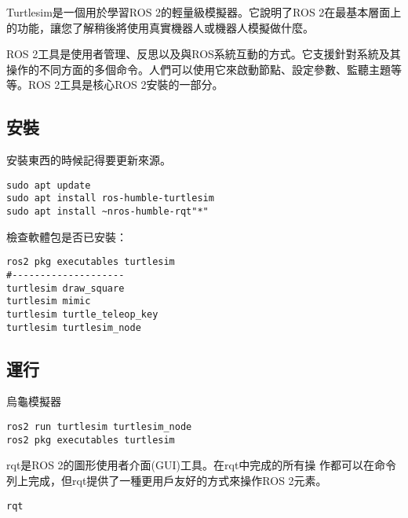 Turtlesim是一個用於學習ROS 2的輕量級模擬器。它說明了ROS 2在最基本層面上的功能，讓您了解稍後將使用真實機器人或機器人模擬做什麼。

ROS 2工具是使用者管理、反思以及與ROS系統互動的方式。它支援針對系統及其操作的不同方面的多個命令。人們可以使用它來啟動節點、設定參數、監聽主題等等。ROS 2工具是核心ROS 2安裝的一部分。

\subsection*{安裝}
安裝東西的時候記得要更新來源。
\begin{verbatim}
sudo apt update
sudo apt install ros-humble-turtlesim
sudo apt install ~nros-humble-rqt"*"
\end{verbatim}
檢查軟體包是否已安裝：
\begin{verbatim}
ros2 pkg executables turtlesim
#--------------------
turtlesim draw_square
turtlesim mimic
turtlesim turtle_teleop_key
turtlesim turtlesim_node
\end{verbatim}

\subsection*{運行}
烏龜模擬器
\begin{verbatim}
ros2 run turtlesim turtlesim_node
ros2 pkg executables turtlesim
\end{verbatim}

rqt是ROS 2的圖形使用者介面(GUI)工具。在rqt中完成的所有操
作都可以在命令列上完成，但rqt提供了一種更用戶友好的方式來操作ROS
2元素。
\begin{verbatim}
rqt
\end{verbatim}

